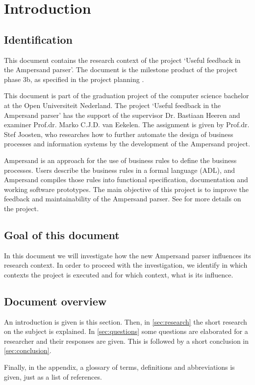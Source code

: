 
\section{Introduction}
\subsection{Identification}
This document contains the research context of the project `Useful feedback in the Ampersand parser'.
The document is the milestone product of the project phase 3b, as specified in the project planning .

This document is part of the graduation project of the computer science bachelor at the Open Universiteit Nederland.
The project `Useful feedback in the Ampersand parser' has the support of the supervisor Dr. Bastiaan Heeren and examiner Prof.dr. Marko C.J.D. van Eekelen.
The assignment is given by Prof.dr. Stef Joosten, who researches how to further automate the design of business processes and information systems by the development of the Ampersand project.

Ampersand is an approach for the use of business rules to define the business processes.
Users describe the business rules in a formal language (ADL), and Ampersand compiles those rules into functional specification, documentation and working software
prototypes.
The main objective of this project is to improve the feedback and maintainability of the Ampersand parser.
See  for more details on the project.

\subsection{Goal of this document}
In this document we will investigate how the new Ampersand parser influences its research context.
In order to proceed with the investigation, we identify in which contexts the project is executed and for which context, what is its influence.

\subsection{Document overview}
An introduction is given is this section.
Then, in \autoref{sec:research} the short research on the subject is explained.
In \autoref{sec:questions} some questions are elaborated for a researcher and their responses are given.
This is followed by a short conclusion in \autoref{sec:conclusion}.

Finally, in the appendix, a glossary of terms, definitions and abbreviations is given, just as a list of references.
